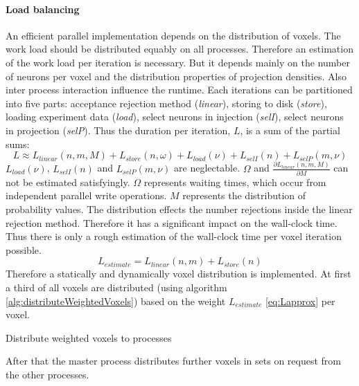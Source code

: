 \paragraph{Load balancing}
\label{par:loadbalancing}
An efficient parallel implementation depends on the distribution of voxels.
The work load should be distributed equably on all processes.
Therefore an estimation of the work load per iteration is necessary.
But it depends mainly on the number of neurons per voxel and the distribution properties of projection densities.
Also inter process interaction influence the runtime.
Each iterations can be partitioned into five parts: acceptance rejection method (\emph{linear}), storing to disk (\emph{store}),
loading experiment data (\emph{load}), select neurons in injection (\emph{selI}), select neurons in projection (\emph{selP}).
Thus the duration per iteration, $L$, is a sum of the partial sums:
\begin{equation} \label{eq:L}
	L \approx L_{linear}(n,m,M) + L_{store}(n,\omega) + L_{load}(\nu) + L_{selI}(n) + L_{selP}(m,\nu)
\end{equation}
$L_{load}(\nu)$, $L_{selI}(n)$ and $L_{selP}(m,\nu)$ are neglectable.
$\Omega$ and $\frac{\partial L_{linear}(n,m,M)}{\partial M}$  can not be estimated satisfyingly.
$\Omega$ represents waiting times, which occur from independent parallel write operations.
$M$ represents the distribution of probability values.
The distribution effects the number rejections inside the linear rejection method.
Therefore it has a significant impact on the wall-clock time.
Thus there is only a rough estimation of the wall-clock time per voxel iteration possible.
\begin{equation} \label{eq:Lapprox}
	L_{estimate} = L_{linear}(n,m) + L_{store}(n)
\end{equation}
Therefore a statically and dynamically voxel distribution is implemented.
At first a third of all voxels are distributed (using algorithm \ref{alg:distributeWeightedVoxels}) based on the weight $L_{estimate}$ \ref{eq:Lapprox}  per voxel.
\begin{algorithm}[ht!]
\caption{Distribute weighted voxels to processes}
\label{alg:distributeWeightedVoxels}
\end{algorithm}
After that the master process distributes further voxels in sets on request from the other processes.

